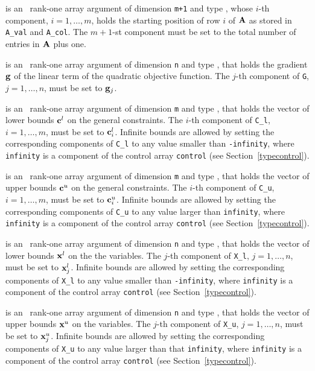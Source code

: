\documentclass{galahad}
\begin{document}
\begin{description}
 is an \intentin\ rank-one array argument
of dimension {\tt m+1} and type \integer,
whose $i$-th component, $i = 1, \ldots , m$, holds the  starting position
of row $i$ of ${\mathbf{A}}$ as stored in {\tt A\_val} and {\tt A\_col}.
The $m+1$-st component must be set to the total number of entries
in ${\mathbf{A}}$ plus one.

 is an \intentin\ rank-one array argument of dimension {\tt n}
and type \realdp, that holds the gradient ${\mathbf{g}}$
of the linear term of the quadratic objective function.
The $j$-th component of {\tt G}, $j = 1,  \ldots ,  n$, must be set to
${\mathbf{g}}_{j}$.

 is an \intentin\ rank-one array argument of dimension {\tt m}
and type \realdp, that holds the vector of lower bounds ${\mathbf{c}}^{l}$
on the general constraints. The $i$-th component of
{\tt C\_l}, $i = 1, \ldots , m$, must be set to ${\mathbf{c}}_{i}^{l}$.
Infinite bounds are allowed by setting the corresponding
components of {\tt C\_l} to any value smaller than {\tt -infinity},
where {\tt infinity} is a component of the control array {\tt control}
(see Section~\ref{typecontrol}).

 is an \intentin\ rank-one array argument of dimension {\tt m}
and type \realdp, that holds the vector of upper bounds ${\mathbf{c}}^{u}$
on the general constraints. The $i$-th component of
{\tt C\_u}, $i = 1,  \ldots ,  m$, must be set to ${\mathbf{c}}_{i}^{u}$.
Infinite bounds are allowed by setting the corresponding
components of {\tt C\_u} to any value larger than {\tt infinity},
where {\tt infinity} is a component of the control array {\tt control}
(see Section~\ref{typecontrol}).

 is an \intentin\ rank-one array argument of dimension {\tt n}
and type \realdp, that holds
the vector of lower bounds ${\mathbf{x}}^{l}$ on the the variables.
The $j$-th component of {\tt X\_l}, $j = 1, \ldots , n$,
must be set to ${\mathbf{x}}_{j}^{l}$.
Infinite bounds are allowed by setting the corresponding
components of {\tt X\_l} to any value smaller than {\tt -infinity},
where {\tt infinity} is a component of the control array {\tt control}
(see Section~\ref{typecontrol}).

 is an \intentin\  rank-one array argument of dimension {\tt n}
and type \realdp, that holds
the vector of upper bounds ${\mathbf{x}}^{u}$ on the variables.
The $j$-th component of {\tt X\_u}, $j = 1, \ldots , n$,
must be set to ${\mathbf{x}}_{j}^{u}$.
Infinite bounds are allowed by setting the corresponding
components of {\tt X\_u} to any value larger than that {\tt infinity},
where {\tt infinity} is a component of the control array {\tt control}
(see Section~\ref{typecontrol}).


\end{description}
\end{document}
